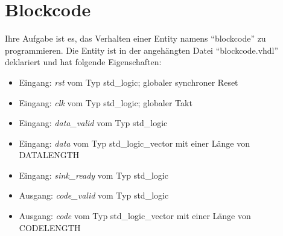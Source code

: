 \documentclass[a4paper,12pt]{article}
\begin{document}

\setlength{\parindent}{0em}
\section*{\noindent Blockcode}

Ihre Aufgabe ist es, das Verhalten einer Entity  namens "`blockcode"' zu programmieren. Die Entity ist in der angeh\"angten Datei "`blockcode.vhdl"' deklariert und hat folgende Eigenschaften:

\begin{itemize}
	\item Eingang: \textit{rst} vom Typ std\_logic; globaler synchroner Reset
	\item Eingang: \textit{clk} vom Typ std\_logic; globaler Takt
	\item Eingang: \textit{data\_valid} vom Typ std\_logic
	\item Eingang: \textit{data} vom Typ std\_logic\_vector mit einer L\"ange von {{DATALENGTH}}
	\item Eingang: \textit{sink\_ready} vom Typ std\_logic
	\item Ausgang: \textit{code\_valid} vom Typ std\_logic
	\item Ausgang: \textit{code} vom Typ std\_logic\_vector mit einer L\"ange von {{CODELENGTH}}

\end{itemize}
\end{document}
